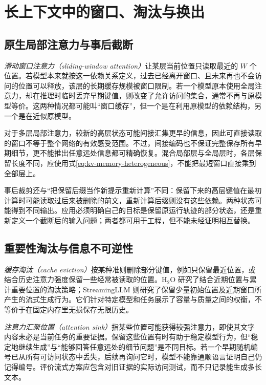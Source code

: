 \documentclass[UTF8,12pt,a4paper,fontset=fandol]{ctexart}
\begin{document}
\section{长上下文中的窗口、淘汰与换出}
\label{sec:kv-long-context}

\subsection{原生局部注意力与事后截断}

\emph{滑动窗口注意力（sliding-window attention）}让某层当前位置只读取最近的 $W$ 个位置。若模型本来就按这一依赖关系定义，过去已经离开窗口、且未来再也不会访问的位置可以释放，该层的长期缓存规模被窗口限制。若一个模型原本使用全局注意力，却在推理时临时丢弃早期键值，则改变了允许访问的集合，通常不再与原模型等价。这两种情况都可能叫“窗口缓存”，但一个是在利用原模型的依赖结构，另一个是在近似原模型。

对于多层局部注意力，较新的高层状态可能间接汇集更早的信息，因此可直接读取的窗口不等于整个网络的有效感受范围。不过，间接编码也不保证完整保存所有早期细节，更不能推出任意远处信息都可精确恢复。混合局部层与全局层时，各层保留长度不同，应使用式\eqref{eq:kv-memory-heterogeneous}，不能把最短窗口直接乘到全部层上。

事后裁剪还与“把保留后缀当作新提示重新计算”不同：保留下来的高层键值在最初计算时可能读取过后来被删除的前文，重新计算后缀则没有这些依赖。两种状态可能得到不同输出。应用必须明确自己的目标是保留原运行轨迹的部分状态，还是重新定义一个截断后的输入问题；两者都可用于工程，但不能未经证明相互替换。

\subsection{重要性淘汰与信息不可逆性}

\emph{缓存淘汰（cache eviction）}按某种准则删除部分键值，例如只保留最近位置，或结合历史注意力强度保留一些经常被读取的位置。H$_2$O 研究了结合近期位置与累计重要位置的淘汰策略\cite{h2o}；StreamingLLM 则研究了保留少量初始位置及近期窗口所产生的流式生成行为\cite{streaming}。它们针对特定模型和任务展示了容量与质量之间的权衡，不等价于在固定内存里无损保存无限历史。

\emph{注意力汇聚位置（attention sink）}指某些位置可能获得较强注意力，即使其文字内容未必是当前任务的重要证据。保留这些位置有时有助于稳定模型行为，但“稳定地继续生成”与“能够回答任意远处的细节问题”是不同目标。若一个早期随机编号已从所有可访问状态中丢失，后续再询问它时，模型不能靠通顺语言证明自己仍记得编号。评价流式方案应包含对旧证据的实际访问测试，而不只记录能生成多长文本。
\end{document}
